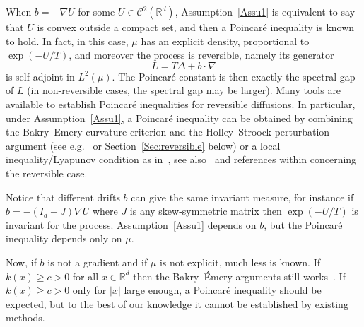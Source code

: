 \documentclass[AHL,Unicode,longabstracts,published]{cedram}
\newcommand{\R}{\mathbb R}
\newcommand{\clC}{\mathcal C}
\newcommand{\na}{\nabla}
\newcommand{\1}{\mathbbm{1}}
\newcommand{\R}{\mathbb R}
\begin{document}
When $b=-\na U$ for some $U\in\clC^2(\R^d)$, Assumption~\ref{Assu1} is equivalent to say that $U$ is convex outside a compact set, and then a Poincaré inequality is known to hold. In fact, in this case, $\mu$ has an explicit density, proportional to $\exp(-U/T)$, and moreover the process is reversible, namely its generator
\begin{equation}\label{eq:generateur}
L = T\Delta + b\cdot \na
\end{equation}
is self-adjoint in $L^2(\mu)$. The Poincaré constant is then exactly the spectral gap of $L$ (in non-reversible cases, the spectral gap may be larger). Many tools are available to establish Poincaré inequalities for reversible diffusions. In particular, under Assumption~\ref{Assu1}, a Poincaré inequality can be obtained by combining the Bakry--Emery curvature criterion and the Holley--Stroock perturbation argument (see e.g.~\cite[Propositions~4.2.7 and Proposition~4.8.1]{BakryGentilLedoux} or Section~\ref{Sec:reversible} below) or a local inequality/Lyapunov condition as in~\cite{BakryCattiauxGuillin,CattiauxGuillin}, see also~\cite{BakryCattiauxGuillin,BakryGentilLedoux,CattiauxGuillinFathi} and references within concerning the reversible case.



Notice that different drifts $b$ can give the same invariant measure, for instance if $b = -(I_d +J)\na U$ where $J$ is any skew-symmetric matrix then $\exp(-U/T)$ is invariant for the process. Assumption~\ref{Assu1} depends on $b$, but the Poincaré inequality depends only on $\mu$.

Now, if $b$ is not a gradient and if $\mu$ is not explicit, much less is known. If $k(x)\geqslant c>0$ for all $x\in\R^d$ then the Bakry--Émery arguments still works~\cite{CattiauxGuillinSLC,MonmarcheContraction}. If $k(x) \geqslant c>0$ only for $|x|$ large enough, a Poincaré inequality should be expected, but to the best of our knowledge it cannot be established by existing methods.
\end{document}
